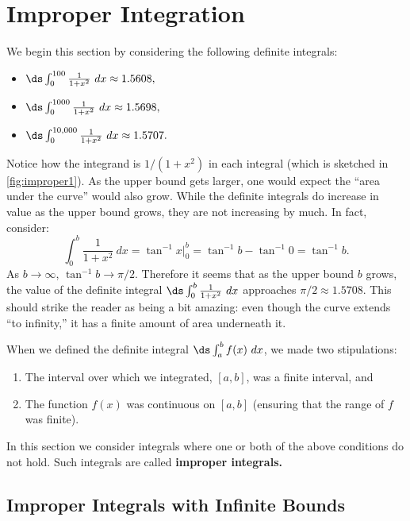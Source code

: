 \section{Improper Integration}\label{sec:improper_integration}

We begin this section by considering the following definite integrals:
\begin{itemize}
\item	$\ds \int_0^{100}\frac1{1+x^2}\ dx \approx 1.5608,$
\item	$\ds \int_0^{1000}\frac1{1+x^2}\ dx \approx 1.5698,$
\item	$\ds \int_0^{10,000}\frac1{1+x^2}\ dx \approx 1.5707.$
\end{itemize}

Notice how the integrand is $1/(1+x^2)$ in each integral (which is sketched in \autoref{fig:improper1}). As the upper bound gets larger, one would expect the ``area under the curve'' would also grow. While the definite integrals do increase in value as the upper bound grows, they are not  increasing by much. In fact, consider:
$$\int_0^b \frac{1}{1+x^2}\ dx = \tan^{-1}x\Big|_0^b = \tan^{-1}b-\tan^{-1}0 = \tan^{-1}b.$$
As $b\rightarrow \infty$, $\tan^{-1}b \rightarrow \pi/2.$ Therefore it seems that as the upper bound $b$ grows, the value of the definite integral $\ds \int_0^b\frac{1}{1+x^2}\ dx$ approaches $\pi/2\approx 1.5708$. This should strike the reader as being a bit amazing: even though the curve extends ``to infinity,'' it has a finite amount of area underneath it.


When we defined the definite integral $\ds\int_a^b f(x)\ dx$, we made two stipulations:
	\begin{enumerate}
	\item		The interval over which we integrated, $[a,b]$, was a finite interval, and
	\item		The function $f(x)$ was continuous on $[a,b]$ (ensuring that the range of $f$ was finite).
	\end{enumerate}
	
In this section we consider integrals where one or both of the above conditions do not hold. Such integrals are called \textbf{improper integrals.}

\clearpage

\subsection*{Improper Integrals with Infinite Bounds}

